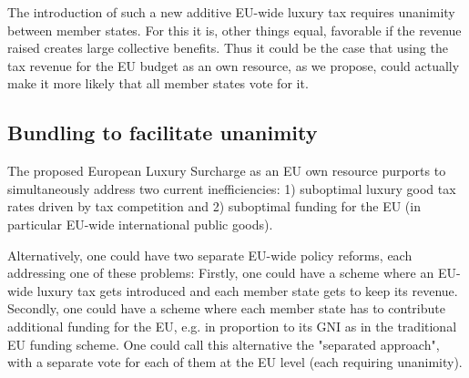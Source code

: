 \documentclass{article}
\begin{document}
The introduction of such a new additive EU-wide luxury tax%
requires unanimity between member states. %
For this it is, other things equal, favorable if the revenue raised creates large collective benefits. Thus it could be the case that using the tax revenue for the EU budget as an own resource, as we propose, could actually make it more likely that all member states vote for it.



\subsection{Bundling to facilitate unanimity} 

The proposed European Luxury Surcharge as an EU own resource purports to simultaneously address two current inefficiencies: 1) suboptimal luxury good tax rates driven by tax competition and 2) suboptimal funding for the EU (in particular EU-wide international public goods). 

Alternatively, one could have two separate EU-wide policy reforms, each addressing one of these problems: Firstly, one could have a scheme where an EU-wide luxury tax gets introduced and each member state gets to keep its revenue. Secondly, one could have a scheme where each member state has to contribute additional funding for the EU, e.g. in proportion to its GNI as in the traditional EU funding scheme. One could call this alternative the "separated approach", with a separate vote for each of them at the EU level (each requiring unanimity).
\end{document}
